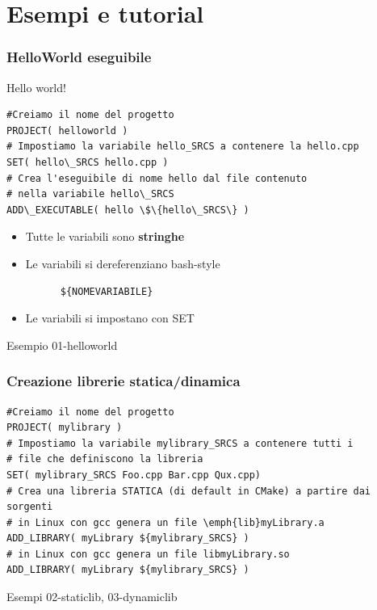 \documentclass[10pt] {beamer}
\begin{document}
\section{Esempi e tutorial}

\begin{frame}[fragile]
\frametitle{HelloWorld eseguibile}

\begin{block}{Hello world!}
\begin{small}
\begin{verbatim}
#Creiamo il nome del progetto
PROJECT( helloworld )
# Impostiamo la variabile hello_SRCS a contenere la hello.cpp
SET( hello\_SRCS hello.cpp )
# Crea l'eseguibile di nome hello dal file contenuto 
# nella variabile hello\_SRCS
ADD\_EXECUTABLE( hello \$\{hello\_SRCS\} )
\end{verbatim}
\end{small}
\end{block}

\begin{itemize}
	\item Tutte le variabili sono \textbf{stringhe}
	\item Le variabili si dereferenziano bash-style 
	  \begin{verbatim}
	  ${NOMEVARIABILE} 
	  \end{verbatim}
	\item Le variabili si impostano con SET
\end{itemize}
Esempio 01-helloworld
\end{frame}


\begin{frame}[fragile]
	\frametitle{Creazione librerie statica/dinamica}
\begin{verbatim}
#Creiamo il nome del progetto
PROJECT( mylibrary )
# Impostiamo la variabile mylibrary_SRCS a contenere tutti i 
# file che definiscono la libreria
SET( mylibrary_SRCS Foo.cpp Bar.cpp Qux.cpp)
# Crea una libreria STATICA (di default in CMake) a partire dai sorgenti
# in Linux con gcc genera un file \emph{lib}myLibrary.a
ADD_LIBRARY( myLibrary ${mylibrary_SRCS} )
# in Linux con gcc genera un file libmyLibrary.so
ADD_LIBRARY( myLibrary ${mylibrary_SRCS} )
\end{verbatim}

Esempi 02-staticlib, 03-dynamiclib

\end{frame}
\end{document}
